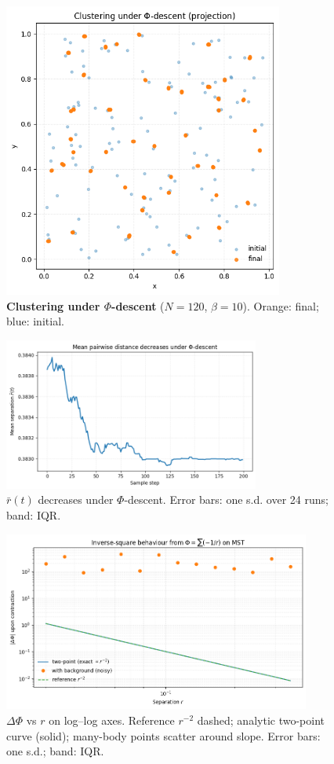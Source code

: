 \documentclass[aps,preprint,onecolumn,longbibliography,nofootinbib]{revtex4-2}
\numberwithin{equation}{section}
\begin{document}
\begin{figure}[H]\centering\includegraphics[width=0.82\textwidth]{figures/clustering.png}\caption{\textbf{Clustering under $\Phi$-descent} ($N{=}120$, $\beta{=}10$). Orange: final; blue: initial.}\label{fig:clustering}\end{figure}
\begin{figure}[H]\centering\includegraphics[width=0.75\textwidth]{figures/mean_distance.png}\caption{$\bar r(t)$ decreases under $\Phi$-descent. Error bars: one s.d. over 24 runs; band: IQR.}\label{fig:mean}\end{figure}
\begin{figure}[H]\centering\includegraphics[width=0.9\textwidth]{figures/inverse_square.png}\caption{$\Delta\Phi$ vs $r$ on log--log axes. Reference $r^{-2}$ dashed; analytic two-point curve (solid); many-body points scatter around slope. Error bars: one s.d.; band: IQR.}\label{fig:inverse}\end{figure}
\end{document}
